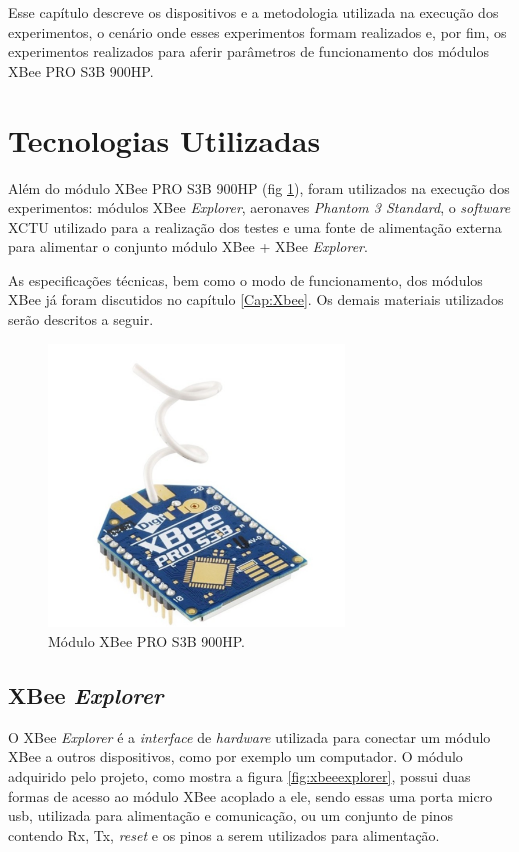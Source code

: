 \label{Cap:Procedimento}

Esse capítulo descreve os dispositivos e a metodologia utilizada na execução dos experimentos, o cenário onde esses experimentos formam realizados e, por fim, os experimentos realizados para aferir parâmetros de funcionamento dos módulos XBee PRO S3B 900HP.

\section{Tecnologias Utilizadas}

Além do módulo XBee PRO S3B 900HP (fig \ref{fig:xbeepro}), foram utilizados na execução dos experimentos: módulos XBee \emph{Explorer}, aeronaves \emph{Phantom 3 Standard}, o \emph{software} XCTU utilizado para a realização dos testes e uma fonte de alimentação externa para alimentar o conjunto módulo XBee + XBee \emph{Explorer}.

As especificações técnicas, bem como o modo de funcionamento, dos módulos XBee já foram discutidos no capítulo \ref{Cap:Xbee}. Os demais materiais utilizados serão descritos a seguir.

\begin{figure}[h!] 
\center
\includegraphics[width=0.7\textwidth]{xbeepro.png}
\caption{Módulo XBee PRO S3B 900HP.} 
\label{fig:xbeepro}
\end{figure}

\subsection{XBee \emph{Explorer}}

O XBee \emph{Explorer} é a \emph{interface} de \emph{hardware} utilizada para conectar um módulo XBee a outros dispositivos, como por exemplo um computador. O módulo adquirido pelo projeto, como mostra a figura \ref{fig:xbeeexplorer}, possui duas formas de acesso ao módulo XBee acoplado a ele, sendo essas uma porta micro usb, utilizada para alimentação e comunicação, ou um conjunto de pinos contendo Rx, Tx, \emph{reset} e os pinos a serem utilizados para alimentação.

